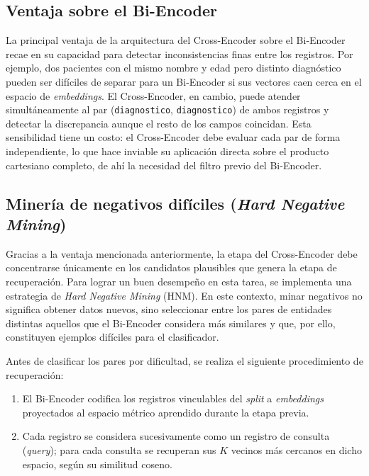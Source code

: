 \subsection{Ventaja sobre el Bi-Encoder}

La principal ventaja de la arquitectura del Cross-Encoder sobre el Bi-Encoder recae en su capacidad para detectar inconsistencias finas entre los registros. Por ejemplo, dos pacientes con el mismo nombre y edad pero distinto diagnóstico pueden ser difíciles de separar para un Bi-Encoder si sus vectores caen cerca en el espacio de \textit{embeddings}. El Cross-Encoder, en cambio, puede atender simultáneamente al par (\texttt{diagnostico}, \texttt{diagnostico}) de ambos registros y detectar la discrepancia aunque el resto de los campos coincidan. Esta sensibilidad tiene un costo: el Cross-Encoder debe evaluar cada par de forma independiente, lo que hace inviable su aplicación directa sobre el producto cartesiano completo, de ahí la necesidad del filtro previo del Bi-Encoder.

\subsection{Minería de negativos difíciles (\textit{Hard Negative Mining})}

Gracias a la ventaja mencionada anteriormente, la etapa del Cross-Encoder debe concentrarse únicamente en los candidatos plausibles que genera la etapa de recuperación. Para lograr un buen desempeño en esta tarea, se implementa una estrategia de \textit{Hard Negative Mining} (HNM). En este contexto, minar negativos no significa obtener datos nuevos, sino seleccionar entre los pares de entidades distintas aquellos que el Bi-Encoder considera más similares y que, por ello, constituyen ejemplos difíciles para el clasificador.

Antes de clasificar los pares por dificultad, se realiza el siguiente procedimiento de recuperación:

\begin{enumerate}
\item El Bi-Encoder codifica los registros vinculables del \textit{split} a \textit{embeddings} proyectados al espacio métrico aprendido durante la etapa previa.
\item Cada registro se considera sucesivamente como un registro de consulta (\textit{query}); para cada consulta se recuperan sus $K$ vecinos más cercanos en dicho espacio, según su similitud coseno.
\end{enumerate}


